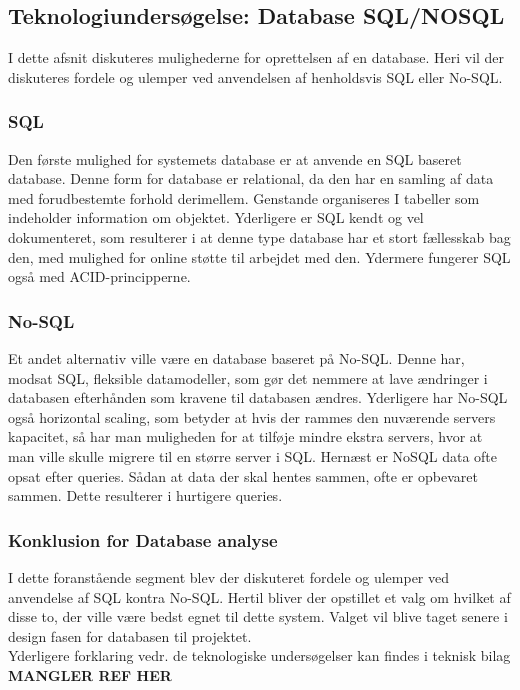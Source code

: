 \subsection{Teknologiundersøgelse: Database SQL/NOSQL
}
I dette afsnit diskuteres mulighederne for oprettelsen af en database. Heri vil der diskuteres fordele og ulemper ved anvendelsen af henholdsvis SQL eller No-SQL.

\subsubsection{SQL}
Den første mulighed for systemets database er at anvende en SQL baseret database. Denne form for database
er relational, da den har en samling af data med forudbestemte forhold derimellem. Genstande
organiseres I tabeller som indeholder information om objektet. Yderligere er SQL kendt og vel
dokumenteret, som resulterer i at denne type database har et stort fællesskab bag den, med mulighed for online støtte til arbejdet med den. Ydermere fungerer SQL også med ACID-principperne.

\subsubsection{No-SQL}
Et andet alternativ ville være en database baseret på No-SQL. Denne har, modsat SQL, fleksible
datamodeller, som gør det nemmere at lave ændringer i databasen efterhånden som kravene til
databasen ændres. Yderligere har No-SQL også horizontal scaling, som betyder at hvis der rammes
den nuværende servers kapacitet, så har man muligheden for at tilføje mindre ekstra servers, hvor at man ville skulle migrere til en større server i SQL. Hernæst er NoSQL data ofte opsat efter queries. Sådan at data der skal hentes sammen,
ofte er opbevaret sammen. Dette resulterer i hurtigere queries.

\subsubsection{Konklusion for Database analyse}
I dette foranstående segment blev der diskuteret fordele og ulemper ved anvendelse af SQL kontra
No-SQL. Hertil bliver der opstillet et valg om hvilket af disse to, der ville være bedst egnet til dette
system. Valget vil blive taget senere i design fasen for databasen til projektet.
\cite{Yalantis} \cite{IBM} \cite{MongoDB.com} \\

\noindent Yderligere forklaring vedr. de teknologiske undersøgelser kan findes i teknisk bilag \textbf{MANGLER REF HER}
